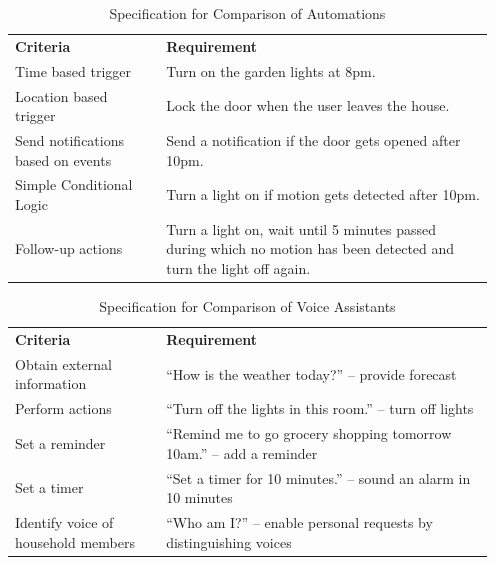 \begin{table}[H]
    \centering
    \caption{Specification for Comparison of Automations}
    \label{tab:spec_automations}
    \begin{tabular}{ >{\raggedright} p{0.3\linewidth} p{0.65\linewidth} }
        \toprule
        \multicolumn{2}{ l }{\textbf{Automations}} \\
        \midrule
        \textbf{Criteria} & \textbf{Requirement} \\
        \midrule
        Time based trigger & Turn on the garden lights at 8pm.\\ \addlinespace
        Location based trigger & Lock the door when the user leaves the house.\\ \addlinespace
        Send notifications based on events & Send a notification if the door gets opened after 10pm.\\ \addlinespace
        Simple Conditional Logic & Turn a light on if motion gets detected after 10pm.\\ \addlinespace
        Follow-up actions & Turn a light on, wait until 5 minutes passed during which no motion has been detected and turn the light off again.\\
        \bottomrule
    \end{tabular}
\end{table}

\begin{table}[H]
    \centering
    \caption{Specification for Comparison of Voice Assistants}
    \label{tab:spec_voiceassistant}
    \begin{tabular}{ >{\raggedright} p{0.3\linewidth} p{0.65\linewidth} }
        \toprule
        \multicolumn{2}{ l }{\textbf{Voice Assistants}} \\
        \midrule
        \textbf{Criteria} & \textbf{Requirement} \\
        \midrule
        Obtain external information & “How is the weather today?” – provide forecast \\ \addlinespace
        Perform actions & “Turn off the lights in this room.” – turn off lights \\ \addlinespace
        Set a reminder & “Remind me to go grocery shopping tomorrow 10am.” – add a reminder \\ \addlinespace
        Set a timer & “Set a timer for 10 minutes.” – sound an alarm in 10 minutes \\ \addlinespace
        Identify voice of household members & “Who am I?” – enable personal requests by distinguishing voices \\
        \bottomrule
    \end{tabular}
\end{table}

